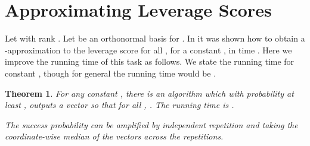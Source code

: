 \documentclass{sig-alternate}
\newtheorem{theorem}{Theorem}
\begin{document}
\section{Approximating Leverage Scores}\label{sec:leverage}
\fi
Let  with rank . Let  be an
orthonormal basis for . In \cite{dmmw11} it was shown how to obtain 
a -approximation  to the leverage score  for all , for a constant ,
in time . Here we improve the running time of this task as
follows. We state the running time for constant , though for general  the running time
would be . 
\begin{theorem}\label{thm:icml}
For any constant , there is an algorithm which with probability at least , outputs
a vector  so that for all , . The running time
is \ifSTOC
.
\else

\fi
The success probability can be amplified by independent repetition and taking the coordinate-wise
median of the vectors  across the repetitions. 
\end{theorem}
\end{document}
